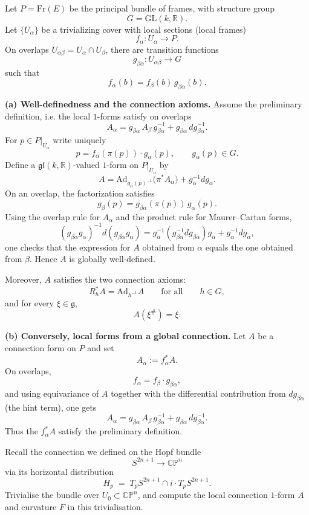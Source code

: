 \begin{solution}
Let $P=\mathrm{Fr}(E)$ be the principal bundle of frames, with structure group
\[
G=\mathrm{GL}(k,\mathbb{R}).
\]
Let $\{U_\alpha\}$ be a trivializing cover with local sections (local frames)
\[
f_\alpha:U_\alpha\longrightarrow P.
\]
On overlaps $U_{\alpha\beta}=U_\alpha\cap U_\beta$, there are transition functions
\[
g_{\beta\alpha}:U_{\alpha\beta}\longrightarrow G
\]
such that
\[
f_\alpha(b)=f_\beta(b)\,g_{\beta\alpha}(b).
\]

\textbf{(a) Well-definedness and the connection axioms.}
Assume the preliminary definition, i.e. the local $1$-forms satisfy on overlaps
\[
A_\alpha
=
g_{\beta\alpha}\,A_\beta\,g_{\beta\alpha}^{-1}
+
g_{\beta\alpha}\,dg_{\beta\alpha}^{-1}.
\]
For $p\in P|_{U_\alpha}$ write uniquely
\[
p=f_\alpha(\pi(p))\cdot g_\alpha(p),
\qquad
g_\alpha(p)\in G.
\]
Define a $\mathfrak{gl}(k,\mathbb{R})$-valued $1$-form on $P|_{U_\alpha}$ by
\[
A
=
\mathrm{Ad}_{g_\alpha(p)^{-1}}\bigl(\pi^*A_\alpha\bigr)
+
g_\alpha^{-1}dg_\alpha.
\]
On an overlap, the factorization satisfies
\[
g_\beta(p)=g_{\beta\alpha}(\pi(p))\,g_\alpha(p).
\]
Using the overlap rule for $A_\alpha$ and the product rule for Maurer--Cartan forms,
\[
(g_{\beta\alpha}g_\alpha)^{-1}d(g_{\beta\alpha}g_\alpha)
=
g_\alpha^{-1}(g_{\beta\alpha}^{-1}dg_{\beta\alpha})g_\alpha
+
g_\alpha^{-1}dg_\alpha,
\]
one checks that the expression for $A$ obtained from $\alpha$ equals the one obtained from $\beta$. Hence $A$ is globally well-defined.

Moreover, $A$ satisfies the two connection axioms:
\[
R_h^*A=\mathrm{Ad}_{h^{-1}}A
\qquad\text{for all}\qquad
h\in G,
\]
and for every $\xi\in\mathfrak{g}$,
\[
A(\xi^\#)=\xi.
\]

\textbf{(b) Conversely, local forms from a global connection.}
Let $A$ be a connection form on $P$ and set
\[
A_\alpha:=f_\alpha^*A.
\]
On overlaps,
\[
f_\alpha=f_\beta\cdot g_{\beta\alpha},
\]
and using equivariance of $A$ together with the differential contribution from $dg_{\beta\alpha}$ (the hint term), one gets
\[
A_\alpha
=
g_{\beta\alpha}\,A_\beta\,g_{\beta\alpha}^{-1}
+
g_{\beta\alpha}\,dg_{\beta\alpha}^{-1}.
\]
Thus the $f_\alpha^*A$ satisfy the preliminary definition.
\end{solution}

\begin{problem}
\label{prob:cp-vii-0031}
Recall the connection we defined on the Hopf bundle
\[
S^{2n+1}\longrightarrow \mathbb{CP}^n
\]
via its horizontal distribution
\[
H_p \;=\; T_pS^{2n+1}\cap i\cdot T_pS^{2n+1}.
\]
Trivialise the bundle over $U_0\subset \mathbb{CP}^n$, and compute the local connection $1$-form $A$ and curvature $F$ in this trivialisation.
\end{problem}

